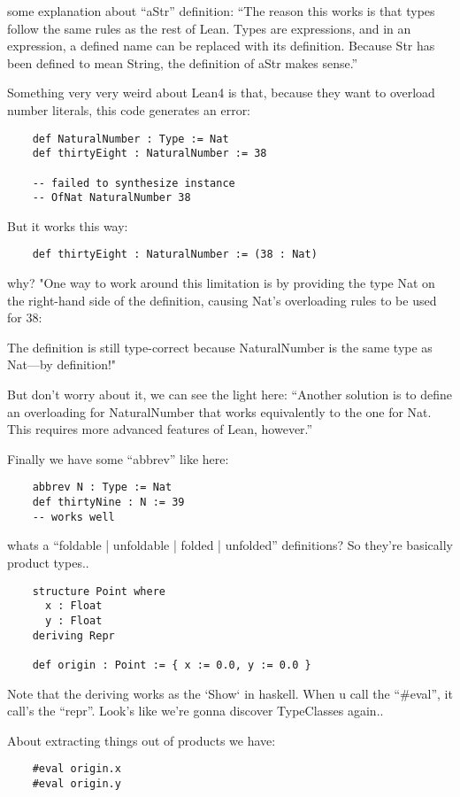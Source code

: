\documentclass[11pt]{scrlttr2}
\begin{document}
\begin{letter}{%
\mbox{}}
some explanation about ``aStr'' definition:
``The reason this works is that types follow the same rules as the rest of Lean. Types are expressions,
and in an expression, a defined name can be replaced with its definition. Because Str has been defined
to mean String, the definition of aStr makes sense.''

Something very very weird about Lean4 is that, because they want to overload number literals,
this code generates an error:
\begin{verbatim}
    def NaturalNumber : Type := Nat
    def thirtyEight : NaturalNumber := 38

    -- failed to synthesize instance
    -- OfNat NaturalNumber 38
\end{verbatim}

But it works this way:
\begin{verbatim}
    def thirtyEight : NaturalNumber := (38 : Nat)
\end{verbatim}

why?
"One way to work around this limitation is by providing the type Nat on the right-hand side of the definition, causing Nat's overloading rules to be used for 38:

The definition is still type-correct because NaturalNumber is the same type as Nat—by definition!"

But don't worry about it, we can see the light here:
``Another solution is to define an overloading for NaturalNumber that works equivalently to the one for Nat. This requires more advanced features of Lean, however.''

Finally we have some ``abbrev'' like here:
\begin{verbatim}
    abbrev N : Type := Nat
    def thirtyNine : N := 39
    -- works well
\end{verbatim}
whats a ``foldable | unfoldable | folded | unfolded'' definitions?
So they're basically product types..
\begin{verbatim}
    structure Point where
      x : Float
      y : Float
    deriving Repr

    def origin : Point := { x := 0.0, y := 0.0 }
\end{verbatim}

Note that the deriving works as the `Show` in haskell.
When u call the ``\#eval'', it call's the ``repr''. Look's like
we're gonna discover TypeClasses again..

About extracting things out of products we have:
\begin{verbatim}
    #eval origin.x
    #eval origin.y


\end{verbatim}
\end{letter}
\end{document}
